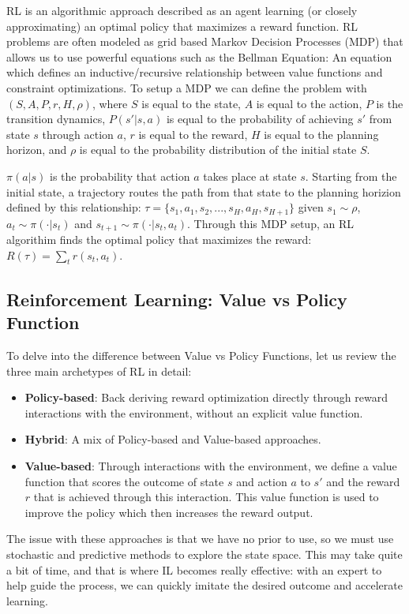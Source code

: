 \documentclass[11pt]{article}
\begin{document}
RL is an algorithmic approach described as an agent learning (or closely approximating) an optimal policy that maximizes a reward function. RL problems are often modeled as grid based Markov Decision Processes (MDP) that allows us to use powerful equations such as the Bellman Equation: An equation which defines an inductive/recursive relationship between value functions and constraint optimizations. To setup a MDP we can define the problem with $(S, A, P, r, H, \rho)$, where $S$ is equal to the state, $A$ is equal to the action, $P$ is the transition dynamics, $P(s'|s,a)$ is equal to the probability of achieving $s'$ from state $s$ through action $a$, $r$ is equal to the reward, $H$ is equal to the planning horizon, and $\rho$ is equal to the probability distribution of the initial state $S$. 

$\pi(a|s)$ is the probability that action $a$ takes place at state $s$. Starting from the initial state, a trajectory routes the path from that state to the planning horizion defined by this relationship: $\tau=\{s_1,a_1,s_2,...,s_H,a_H,s_{H+1}\}$ given $s_1\sim \rho$, $a_t\sim \pi(\cdot|s_t)$ and $s_{t+1}\sim \pi(\cdot|s_t, a_t)$. Through this MDP setup, an RL algorithim finds the optimal policy that maximizes the reward: $R(\tau) = \sum_tr(s_t,a_t)$.


\subsection{Reinforcement Learning: Value vs Policy Function}

To delve into the difference between Value vs Policy Functions, let us review the three main archetypes of RL in detail:

\begin{itemize}
    \item \textbf{Policy-based}: Back deriving reward optimization directly through reward interactions with the environment, without an explicit value function.
    \item \textbf{Hybrid}: A mix of Policy-based and Value-based approaches.
    \item \textbf{Value-based}: Through interactions with the environment, we define a value function that scores the outcome of state $s$ and action $a$ to $s'$ and the reward $r$ that is achieved through this interaction. This value function is used to improve the policy which then increases the reward output.
\end{itemize}

The issue with these approaches is that we have no prior to use, so we must use stochastic and predictive methods to explore the state space. This may take quite a bit of time, and that is where IL becomes really effective: with an expert to help guide the process, we can quickly imitate the desired outcome and accelerate learning. 
\end{document}
